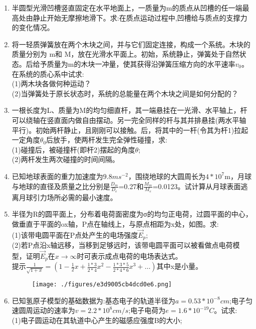 \begin{enumerate}
\item 半圆型光滑凹槽竖直固定在水平地面上，一质量为m的质点从凹槽的任一端最高处由静止开始无摩擦地滑下。求:在质点运动过程中,凹槽给与质点的支撑力的变化情况。
\item 将一轻质弹簧放在两个木块之间，并与它们固定连接，构成一个系统。木块的质量分别为 m和 M，放在光滑水平面上。初始，系统静止，弹簧处于自然状态。后给予质量为m的木块一冲量，使其获得沿弹簧压缩方向的水平速率$v_0$。在系统的质心系中试求:\\
(1)两木块各做何种运动？\\
(2)当弹簧处于原长状态时，系统的总能量在两个木块之间是如何分配的？
\item 一根长度为L、质量为M的均匀细直杆，其一端悬挂在一光滑、水平轴上，杆可以绕轴在竖直面内做自由摆动。另一完全同样的杆与其并排悬挂(两水平轴平行)。初始两杆静止，且刚刚可以接触。后，将其中的一杆(令其为杆1)拉起一定角度$\theta_0$后放手，使两杆发生完全弹性碰撞，求:\\
(1)碰撞后，被碰撞杆(即杆2)摆起的角度$\theta$;\\
(2)两杆发生两次碰撞的时间间隔。
\item 已知地球表面的重力加速度为$9.8ms^{-2}$，围绕地球的大圆周长为$4*10^7$m，月球与地球的直径及质量之比分别是$\frac{D_m}{D_e}$=0.27和$\frac{M_m}{M_e}$=0.0123。试计算从月球表面逃离月球引力场所必需的最小速度。
\item 半径为R的圆平面上，分布着电荷面密度为σ的均匀正电荷，过圆平面的中心，做垂直于平面的ox轴，P点在轴线上，与原点相距为x处，如图。求:\\
(1)该带电圆平面在P点处产生的电场强度$\vec E_p$;\\
(2)若P点沿x轴远移，当移到足够远时，该带电圆平面可以被看做点电荷模型，证明$\vec E_p$在$x \to \infty$时可表示成点电荷的电场表达式。\\
提示$\displaystyle \frac{1}{\sqrt{1+x}}=(1-\frac{1}{2}x+\frac{1*3}{2*4}x^2-\frac{1*3*5}{2*4*6}x^3+\dots)$其中x是小量。
\begin{figure}[ht]
\centering
\texttt{[image: ./figures/e3d9005cb4dcd0e6.png]}
\caption{} \label{fig_SSD10_1}
\end{figure}
\item 已知氢原子模型的基础数据为:基态电子的轨道半径为$a=0.53*10^{-8}cm$;电子匀速圆周运动的速率为$v=2.2*10^8cm/s$;电子电荷为$e=1.6*10^{-19}C$。试求:\\
(1)电子圆运动在其轨道中心产生的磁感应强度B的大小;\\

\end{enumerate}

